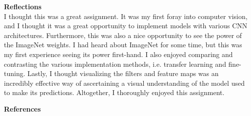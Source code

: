 \documentclass[12pt, letterpaper, onecolumn]{article}
\begin{document}
\vspace{0.125in}
\noindent\textbf{Reflections}\\
\indent I thought this was a great assignment. It was my first foray into computer vision, and I thought it was a great opportunity to implement models with various CNN architectures. Furthermore, this was also a nice opportunity to see the power of the ImageNet weights. I had heard about ImageNet for some time, but this was my first experience seeing its power first-hand. I also enjoyed comparing and contrasting the various implementation methods, i.e. transfer learning and fine-tuning. Lastly, I thought visualizing the filters and feature maps was an incredibly effective way of ascertaining a visual understanding of the model used to make its predictions. Altogether, I thoroughly enjoyed this assignment.

\vspace{0.125in}
\noindent\textbf{References}
\vspace{-0.125in}
\printbibliography[heading=none]
\end{document}
